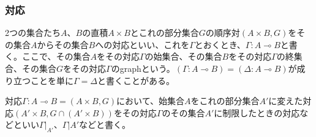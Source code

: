 \documentclass[a4paper]{jsarticle}
\begin{document}
\subsubsection{対応}%
\begin{dfn}
2つの集合たち$A$、$B$の直積$A \times B$とこれの部分集合$G$の順序対$(A \times B,G)$をその集合$A$からその集合$B$への対応といい、これを$\varGamma$とおくとき、$\varGamma:A \multimap B$と書く。ここで、その集合$A$をその対応$\varGamma$の始集合、その集合$B$をその対応$\varGamma$の終集合、その集合$G$をその対応$\varGamma$のgraphという。$(\varGamma:A \multimap B) = (\varDelta:A \multimap B)$が成り立つことを単に$\varGamma = \varDelta$と書くことがある。
\end{dfn}
\begin{dfn}
対応$\varGamma:A \multimap B = (A \times B,G)$において、始集合$A$をこれの部分集合$A'$に変えた対応$\left( A' \times B,G \cap \left( A' \times B \right) \right)$をその対応$\varGamma$のその集合$A'$に制限したときの対応などといい$\left. \varGamma \right|_{A'}$、$\varGamma|A'$などと書く。
\end{dfn}
\end{document}
